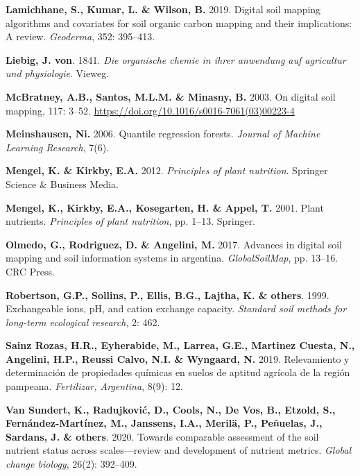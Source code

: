 \documentclass[
  10pt,
  b5paper,
  oneside]{book}
\newlength{\cslhangindent}
\newlength{\cslentryspacingunit} %
\newenvironment{CSLReferences}[2] %
 {%
  \setlength{\parindent}{0pt}
  \ifodd #1
  \let\oldpar\par
  \def\par{\hangindent=\cslhangindent\oldpar}
  \fi
  \setlength{\parskip}{#2\cslentryspacingunit}
 }%
 {}
\begin{document}
\begin{CSLReferences}{0}{0}
\leavevmode{}%
\textbf{Lamichhane, S., Kumar, L. \& Wilson, B.} 2019. Digital soil mapping algorithms and covariates for soil organic carbon mapping and their implications: A review. \emph{Geoderma}, 352: 395--413.

\leavevmode{}%
\textbf{Liebig, J. von}. 1841. \emph{Die organische chemie in ihrer anwendung auf agricultur und physiologie}. Vieweg.

\leavevmode{}%
\textbf{McBratney, A.B., Santos, M.L.M. \& Minasny, B.} 2003. On digital soil mapping, 117: 3--52. \url{https://doi.org/10.1016/s0016-7061(03)00223-4}

\leavevmode{}%
\textbf{Meinshausen, Ni.} 2006. Quantile regression forests. \emph{Journal of Machine Learning Research}, 7(6).

\leavevmode{}%
\textbf{Mengel, K. \& Kirkby, E.A.} 2012. \emph{Principles of plant nutrition}. Springer Science \& Business Media.

\leavevmode{}%
\textbf{Mengel, K., Kirkby, E.A., Kosegarten, H. \& Appel, T.} 2001. Plant nutrients. \emph{Principles of plant nutrition}, pp. 1--13. Springer.

\leavevmode{}%
\textbf{Olmedo, G., Rodriguez, D. \& Angelini, M.} 2017. Advances in digital soil mapping and soil information systems in argentina. \emph{GlobalSoilMap}, pp. 13--16. CRC Press.

\leavevmode{}%
\textbf{Robertson, G.P., Sollins, P., Ellis, B.G., Lajtha, K. \& others}. 1999. Exchangeable ions, pH, and cation exchange capacity. \emph{Standard soil methods for long-term ecological research}, 2: 462.

\leavevmode{}%
\textbf{Sainz Rozas, H.R., Eyherabide, M., Larrea, G.E., Martinez Cuesta, N., Angelini, H.P., Reussi Calvo, N.I. \& Wyngaard, N.} 2019. Relevamiento y determinaci{ó}n de propiedades qu{í}micas en suelos de aptitud agr{í}cola de la regi{ó}n pampeana. \emph{Fertilizar, Argentina}, 8(9): 12.

\leavevmode{}%
\textbf{Van Sundert, K., Radujković, D., Cools, N., De Vos, B., Etzold, S., Fernández-Martínez, M., Janssens, I.A., Merilä, P., Peñuelas, J., Sardans, J. \& others}. 2020. Towards comparable assessment of the soil nutrient status across scales---review and development of nutrient metrics. \emph{Global change biology}, 26(2): 392--409.


\end{CSLReferences}
\end{document}
